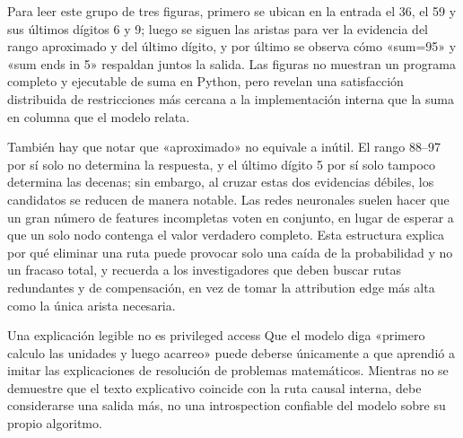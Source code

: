 
Para leer este grupo de tres figuras, primero se ubican en la entrada el 36, el 59 y sus últimos dígitos 6 y 9; luego se siguen las aristas para ver la evidencia del rango aproximado y del último dígito, y por último se observa cómo «sum=95» y «sum ends in 5» respaldan juntos la salida. Las figuras no muestran un programa completo y ejecutable de suma en Python, pero revelan una satisfacción distribuida de restricciones más cercana a la implementación interna que la suma en columna que el modelo relata.

También hay que notar que «aproximado» no equivale a inútil. El rango 88--97 por sí solo no determina la respuesta, y el último dígito 5 por sí solo tampoco determina las decenas; sin embargo, al cruzar estas dos evidencias débiles, los candidatos se reducen de manera notable. Las redes neuronales suelen hacer que un gran número de features incompletas voten en conjunto, en lugar de esperar a que un solo nodo contenga el valor verdadero completo. Esta estructura explica por qué eliminar una ruta puede provocar solo una caída de la probabilidad y no un fracaso total, y recuerda a los investigadores que deben buscar rutas redundantes y de compensación, en vez de tomar la attribution edge más alta como la única arista necesaria.

\begin{warningbox}{Una explicación legible no es privileged access}
Que el modelo diga «primero calculo las unidades y luego acarreo» puede deberse únicamente a que aprendió a imitar las explicaciones de resolución de problemas matemáticos. Mientras no se demuestre que el texto explicativo coincide con la ruta causal interna, debe considerarse una salida más, no una introspection confiable del modelo sobre su propio algoritmo.
\end{warningbox}




